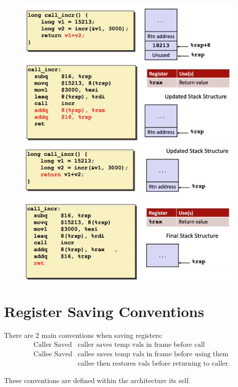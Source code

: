 \documentclass[12pt]{book}
\begin{document}
\begin{figure}[h]
        \includegraphics[scale = 0.1]{./figures/incr4}
        \includegraphics[scale = 0.1]{./figures/incr5}
\end{figure}

\section*{Register Saving Conventions}
There are 2 main conventions when saving registers:
\begin{align*}
        &\text{Caller Saved} &\text{caller saves temp vals in frame before call}\\
        &\text{Callee Saved} &\text{callee saves temp vals in frame before using them}\\
        & &\text{callee then restores vals before returning to caller}
.\end{align*}

These conventions are defined within the architecture its self. 
\end{document}
